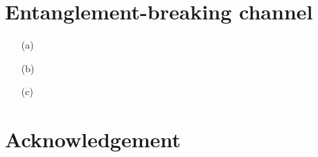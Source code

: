 \documentclass[10pt, a4paper]{article}
\begin{document}
{\section{Entanglement-breaking channel}

\begin{enumerate}
  \item[(a)]
  \item[(b)]
  \item[(c)]  
\end{enumerate}


\section{Acknowledgement}


}

\makereferences


\end{document}
